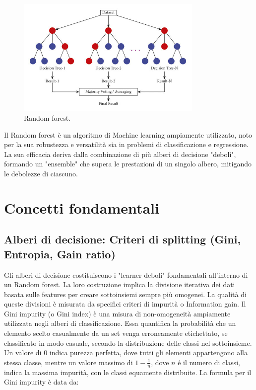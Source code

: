 \documentclass[a4paper,12pt]{report}
\begin{document}
	\begin{figure}[H]
		\centering
		\includegraphics[width=0.8\textwidth]{img/rf.png}
		\caption{Random forest.}
	\end{figure}
	
	Il Random forest è un algoritmo di Machine learning ampiamente utilizzato, noto per la sua robustezza e versatilità sia in problemi di classificazione e regressione. La sua efficacia deriva dalla combinazione di più alberi di decisione "deboli", formando un "ensemble" che supera le prestazioni di un singolo albero, mitigando le debolezze di ciascuno.
	
	\section{Concetti fondamentali}
	
	\subsection{Alberi di decisione: Criteri di splitting (Gini, Entropia, Gain ratio)}
	
	Gli alberi di decisione costituiscono i "learner deboli" fondamentali all'interno di un Random forest. La loro costruzione implica la divisione iterativa dei dati basata sulle features per creare sottoinsiemi sempre più omogenei. La qualità di queste divisioni è misurata da specifici criteri di impurità o Information gain. Il Gini impurity (o Gini index) è una misura di non-omogeneità ampiamente utilizzata negli alberi di classificazione. Essa quantifica la probabilità che un elemento scelto casualmente da un set venga erroneamente etichettato, se classificato in modo casuale, secondo la distribuzione delle classi nel sottoinsieme. Un valore di 0 indica purezza perfetta, dove tutti gli elementi appartengono alla stessa classe, mentre un valore massimo di $1 - \frac{1}{n}$, dove $n$ é il numero di classi, indica la massima impurità, con le classi equamente distribuite. La formula per il Gini impurity è data da:
	
\end{document}
